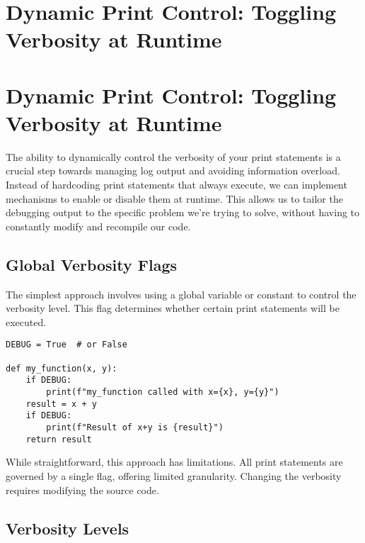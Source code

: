 \documentclass{article}
\begin{document}
{{{%
\newpage

\section*{Dynamic Print Control: Toggling Verbosity at Runtime} %
\label{chapter-4-3-Dynamic_Print_Control__Toggling_Verbosit}

\section*{Dynamic Print Control: Toggling Verbosity at Runtime}

The ability to dynamically control the verbosity of your print statements is a crucial step towards managing log output and avoiding information overload. Instead of hardcoding print statements that always execute, we can implement mechanisms to enable or disable them at runtime. This allows us to tailor the debugging output to the specific problem we're trying to solve, without having to constantly modify and recompile our code.

\subsection*{Global Verbosity Flags}

The simplest approach involves using a global variable or constant to control the verbosity level. This flag determines whether certain print statements will be executed.

\begin{verbatim}
DEBUG = True  # or False

def my_function(x, y):
    if DEBUG:
        print(f"my_function called with x={x}, y={y}")
    result = x + y
    if DEBUG:
        print(f"Result of x+y is {result}")
    return result
\end{verbatim}

While straightforward, this approach has limitations. All print statements are governed by a single flag, offering limited granularity. Changing the verbosity requires modifying the source code.

\subsection*{Verbosity Levels}

}}}
\end{document}
